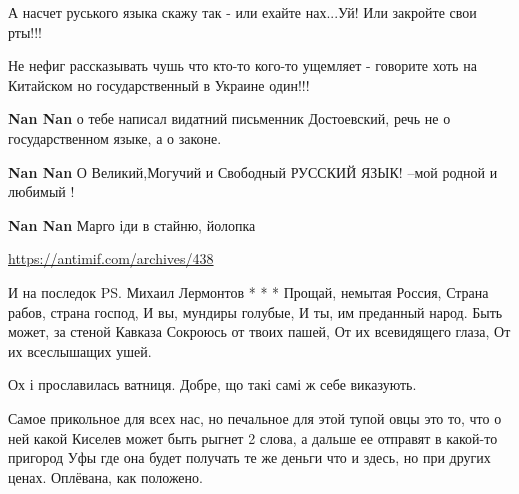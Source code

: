 \begin{itemize}
А насчет руського языка скажу так - или ехайте нах...Уй! Или закройте свои
рты!!!

Не нефиг рассказывать чушь что кто-то кого-то ущемляет - говорите хоть на
Китайском но государственный в Украине один!!!

\begin{itemize}

\textbf{Nan Nan} о тебе написал видатний письменник Достоевский, речь не о государственном языке, а о законе.


\textbf{Nan Nan} О Великий,Могучий и Свободный РУССКИЙ ЯЗЫК! --мой родной и любимый !


\textbf{Nan Nan} Марго іди в стайню, йолопка


\url{https://antimif.com/archives/438}


\obeycr
И на последок PS.
Михаил Лермонтов
* * *
Прощай, немытая Россия,
Страна рабов, страна господ,
И вы, мундиры голубые,
И ты, им преданный народ.
Быть может, за стеной Кавказа
Сокроюсь от твоих пашей,
От их всевидящего глаза,
От их всеслышащих ушей.
\restorecr
\end{itemize}


Ох і прославилась ватниця. Добре, що такі самі ж себе виказують.

\begin{itemize}

Самое прикольное для всех нас, но печальное для этой тупой овцы это то, что о
ней какой Киселев может быть рыгнет 2 слова, а дальше ее отправят в какой-то
пригород Уфы где она будет получать те же деньги что и здесь, но при других
ценах. Оплёвана, как положено.
\end{itemize}


\end{itemize}

